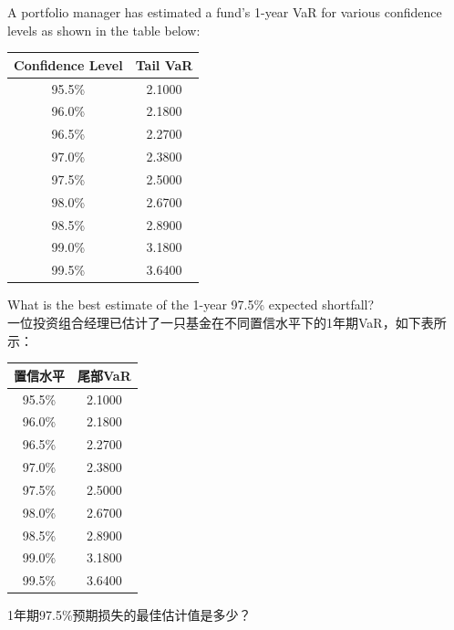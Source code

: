 \documentclass{article}
\newcounter{question} %
\begin{document}
\begin{question}
    A portfolio manager has estimated a fund's 1-year VaR for various confidence levels as shown in the table below:

    \begin{table}[H]
        \centering
        \begin{tabular}{|c|c|}
            \hline
            Confidence Level & Tail VaR \\
            \hline
            95.5\% & 2.1000 \\
            96.0\% & 2.1800 \\
            96.5\% & 2.2700 \\
            97.0\% & 2.3800 \\
            97.5\% & 2.5000 \\
            98.0\% & 2.6700 \\
            98.5\% & 2.8900 \\
            99.0\% & 3.1800 \\
            99.5\% & 3.6400 \\
            \hline
        \end{tabular}
    \end{table}

    What is the best estimate of the 1-year 97.5\% expected shortfall?
    \\一位投资组合经理已估计了一只基金在不同置信水平下的1年期VaR，如下表所示：

    \begin{table}[H]
        \centering
        \begin{tabular}{|c|c|}
            \hline
            置信水平 & 尾部VaR \\
            \hline
            95.5\% & 2.1000 \\
            96.0\% & 2.1800 \\
            96.5\% & 2.2700 \\
            97.0\% & 2.3800 \\
            97.5\% & 2.5000 \\
            98.0\% & 2.6700 \\
            98.5\% & 2.8900 \\
            99.0\% & 3.1800 \\
            99.5\% & 3.6400 \\
            \hline
        \end{tabular}
    \end{table}

    1年期97.5\%预期损失的最佳估计值是多少？
\end{question}
\end{document}

